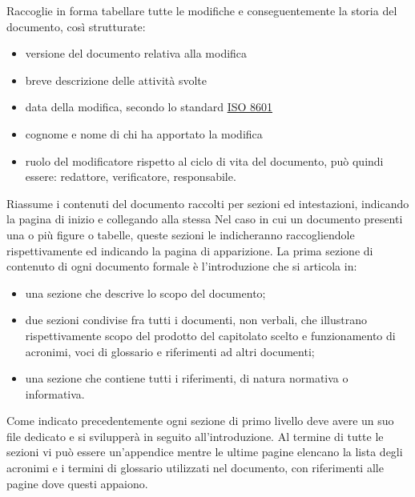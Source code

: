     Raccoglie in forma tabellare tutte le modifiche e conseguentemente la storia del documento, così strutturate:
    \begin{itemize}
        \item versione del documento relativa alla modifica
        \item breve descrizione delle attività svolte
        \item data della modifica, secondo lo standard \href{https://www.iso.org/iso-8601-date-and-time-format.html}{ISO 8601}
        \item cognome e nome di chi ha apportato la modifica
        \item ruolo del modificatore rispetto al ciclo di vita del documento, può quindi essere: redattore, verificatore, responsabile.
    \end{itemize}
    Riassume i contenuti del documento raccolti per sezioni ed intestazioni, indicando la pagina di inizio e collegando alla stessa
    Nel caso in cui un documento presenti una o più figure o tabelle, queste sezioni le indicheranno raccogliendole rispettivamente ed indicando la pagina di apparizione.
    La prima sezione di contenuto di ogni documento formale è l'introduzione che si articola in:
    \begin{itemize}
        \item una sezione che descrive lo scopo del documento;
        \item due sezioni condivise fra tutti i documenti, non verbali, che illustrano rispettivamente scopo del prodotto del capitolato scelto e funzionamento di acronimi, voci di glossario e riferimenti ad altri documenti;
        \item una sezione che contiene tutti i riferimenti, di natura normativa o informativa.
    \end{itemize}
    Come indicato precedentemente ogni sezione di primo livello deve avere un suo file dedicato e si svilupperà in seguito all'introduzione. Al termine di tutte le sezioni vi può essere un'appendice mentre le ultime pagine elencano la lista degli acronimi e i termini di glossario utilizzati nel documento, con riferimenti alle pagine dove questi appaiono.

